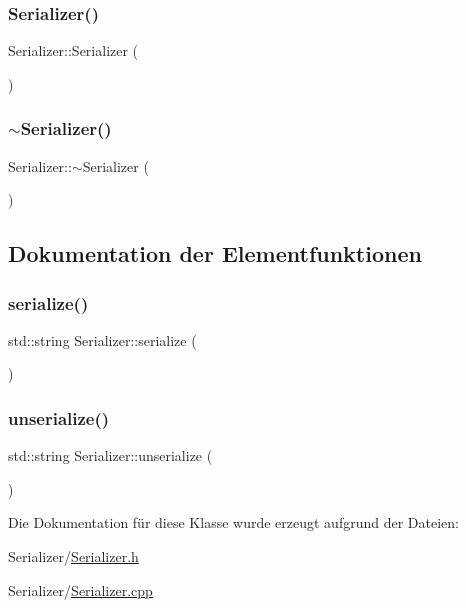 \subsubsection{\texorpdfstring{Serializer()}{Serializer()}}
{\footnotesize\ttfamily Serializer\+::\+Serializer (\begin{DoxyParamCaption}{ }\end{DoxyParamCaption})}

\hypertarget{class_serializer_a42a7d2d8e622ad1ef5f869813b498aa9}{}\label{class_serializer_a42a7d2d8e622ad1ef5f869813b498aa9} 
\subsubsection{\texorpdfstring{$\sim$\+Serializer()}{~Serializer()}}
{\footnotesize\ttfamily Serializer\+::$\sim$\+Serializer (\begin{DoxyParamCaption}{ }\end{DoxyParamCaption})}



\subsection{Dokumentation der Elementfunktionen}
\hypertarget{class_serializer_a76490c3d7c31f10cd2c991731fd54ac5}{}\label{class_serializer_a76490c3d7c31f10cd2c991731fd54ac5} 
\subsubsection{\texorpdfstring{serialize()}{serialize()}}
{\footnotesize\ttfamily std\+::string Serializer\+::serialize (\begin{DoxyParamCaption}{ }\end{DoxyParamCaption})}

\hypertarget{class_serializer_a55d2d0ca552d5a14b316bab0d8f1590a}{}\label{class_serializer_a55d2d0ca552d5a14b316bab0d8f1590a} 
\subsubsection{\texorpdfstring{unserialize()}{unserialize()}}
{\footnotesize\ttfamily std\+::string Serializer\+::unserialize (\begin{DoxyParamCaption}{ }\end{DoxyParamCaption})}



Die Dokumentation für diese Klasse wurde erzeugt aufgrund der Dateien\+:\begin{DoxyCompactItemize}
\item 
Serializer/\hyperlink{_serializer_8h}{Serializer.\+h}\item 
Serializer/\hyperlink{_serializer_8cpp}{Serializer.\+cpp}\end{DoxyCompactItemize}
